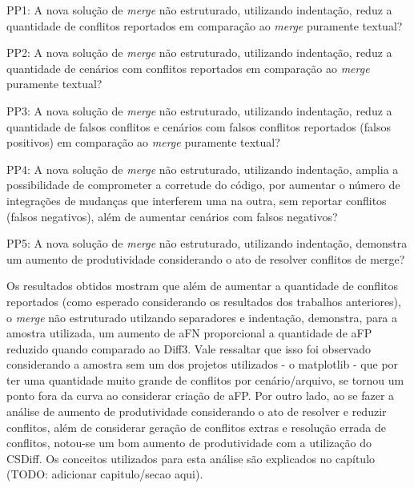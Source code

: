 \begin{compactenum}[1)]
	\item PP1: A nova solução de \emph{merge} não estruturado, utilizando indentação,
	reduz a quantidade de conflitos reportados em comparação ao \emph{merge} puramente textual?
	\item PP2: A nova solução de \emph{merge} não estruturado, utilizando indentação,
	reduz a quantidade de cenários com conflitos reportados em comparação ao \emph{merge} puramente textual?
	\item PP3: A nova solução de \emph{merge} não estruturado, utilizando indentação,
	reduz a quantidade de falsos conflitos e cenários com falsos conflitos reportados (falsos positivos) em comparação ao \emph{merge} puramente textual?
	\item PP4: A nova solução de \emph{merge} não estruturado, utilizando indentação,
	amplia a possibilidade de comprometer a corretude do código, por aumentar o número de integrações de mudanças que interferem uma na outra, sem reportar conflitos (falsos negativos), além de aumentar cenários com falsos negativos?
	\item PP5: A nova solução de \emph{merge} não estruturado, utilizando indentação,
	demonstra um aumento de produtividade considerando o ato de resolver conflitos de merge?
\end{compactenum}

Os resultados obtidos mostram que além de aumentar a quantidade de conflitos reportados
(como esperado considerando os resultados dos trabalhos anteriores),
o \emph{merge} não estruturado utilzando separadores e indentação, demonstra, para a amostra utilizada,
um aumento de aFN proporcional a
quantidade de aFP reduzido quando comparado ao Diff3. Vale ressaltar que isso foi observado considerando a amostra sem
um dos projetos utilizados - o matplotlib - que por ter uma quantidade muito grande de conflitos por cenário/arquivo, se tornou
um ponto fora da curva ao considerar criação de aFP.
Por outro lado, ao se fazer a análise de aumento de produtividade considerando o ato de resolver e reduzir conflitos,
além de considerar geração de conflitos extras e resolução errada de conflitos, notou-se um bom aumento
de produtividade com a utilização do CSDiff. Os conceitos utilizados para esta análise
são explicados no capítulo (TODO: adicionar capitulo/secao aqui).
